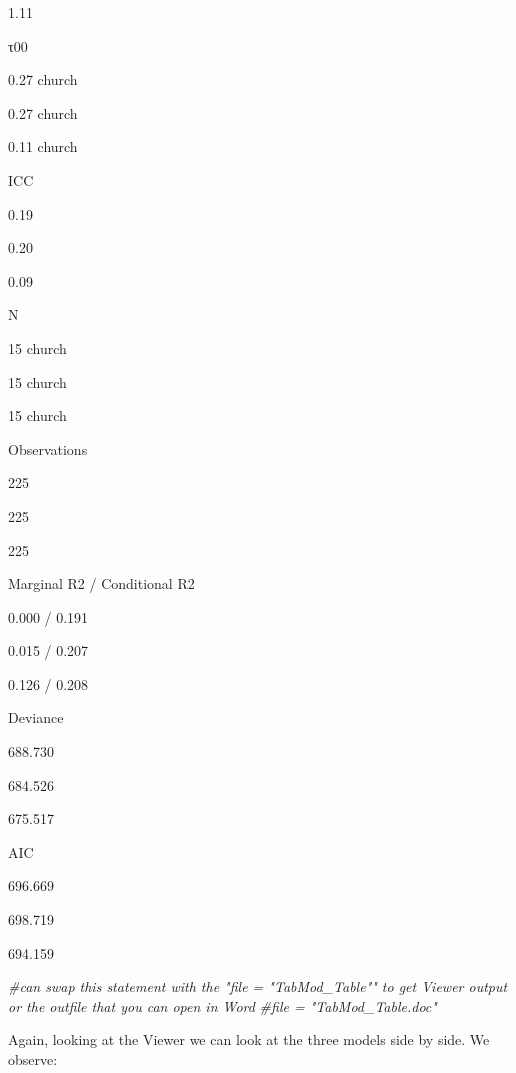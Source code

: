 \documentclass[
  11pt,
]{book}
\newenvironment{Shaded}{\begin{snugshade}}{\end{snugshade}}
\newcommand{\CommentTok}[1]{\textcolor[rgb]{0.56,0.35,0.01}{\textit{#1}}}
\begin{document}
1.11

τ00

0.27 church

0.27 church

0.11 church

ICC

0.19

0.20

0.09

N

15 church

15 church

15 church

Observations

225

225

225

Marginal R2 / Conditional R2

0.000 / 0.191

0.015 / 0.207

0.126 / 0.208

Deviance

688.730

684.526

675.517

AIC

696.669

698.719

694.159

\begin{Shaded}
\begin{Highlighting}[]
\CommentTok{\#can swap this statement with the "file = "TabMod\_Table"" to get Viewer output or the outfile that you can open in Word}
\CommentTok{\#file = "TabMod\_Table.doc"}
\end{Highlighting}
\end{Shaded}

Again, looking at the Viewer we can look at the three models side by side. We observe:
\end{document}
